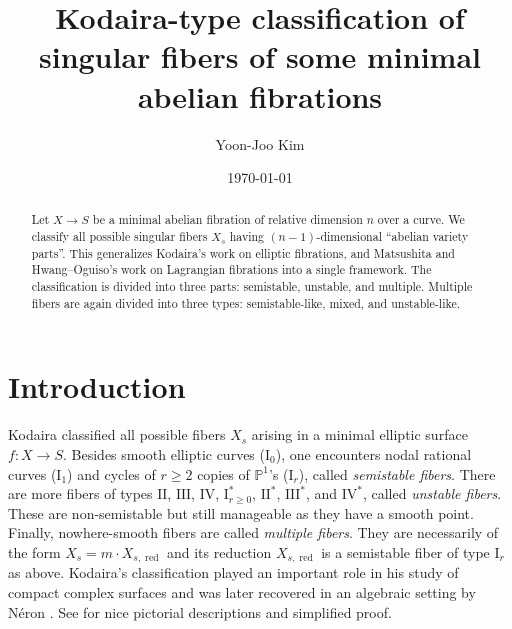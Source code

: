 \documentclass[reqno, letterpaper]{amsart}
\numberwithin{equation}{subsection}
\let\to\longrightarrow
\newcommand{\PP}{\mathbb{P}}
\DeclareMathOperator{\red}{red}
\begin{document}
\title[Singular fiber of abelian fibrations]{Kodaira-type classification of singular fibers of some minimal abelian fibrations}

\author[Y.-J. Kim]{Yoon-Joo Kim}
\address{Department of Mathematics, Columbia University, New York, NY 10027, USA}
\address{HCMC, Korea Institute for Advanced Study, Seoul, South Korea}

\date{\today}

\begin{abstract}
	Let $X \to S$ be a minimal abelian fibration of relative dimension $n$ over a curve. We classify all possible singular fibers $X_s$ having $(n-1)$-dimensional ``abelian variety parts''. This generalizes Kodaira's work on elliptic fibrations, and Matsushita and Hwang--Oguiso's work on Lagrangian fibrations into a single framework. The classification is divided into three parts: semistable, unstable, and multiple. Multiple fibers are again divided into three types: semistable-like, mixed, and unstable-like.
\end{abstract}

\maketitle
\tableofcontents



\section{Introduction}
	Kodaira classified all possible fibers $X_s$ arising in a minimal elliptic surface $f : X \to S$. Besides smooth elliptic curves ($\mathrm I_0$), one encounters nodal rational curves ($\mathrm I_1$) and cycles of $r \ge 2$ copies of $\PP^1$'s ($\mathrm I_r$), called \emph{semistable fibers}. There are more fibers of types $\mathrm{II}$, $\mathrm{III}$, $\mathrm{IV}$, $\mathrm I_{r \ge 0}^*$, $\mathrm{II}^*$, $\mathrm{III}^*$, and $\mathrm{IV}^*$, called \emph{unstable fibers}. These are non-semistable but still manageable as they have a smooth point. Finally, nowhere-smooth fibers are called \emph{multiple fibers}. They are necessarily of the form $X_s = m \cdot X_{s, \red}$ and its reduction $X_{s, \red}$ is a semistable fiber of type $\mathrm I_r$ as above. Kodaira's classification played an important role in his study of compact complex surfaces \cite{kod60, kod63} and was later recovered in an algebraic setting by N\'eron \cite{neron:original_article}. See \cite[\S V.7]{bar-hulek-pet-van:surface} for nice pictorial descriptions and simplified proof.
	
\end{document}

